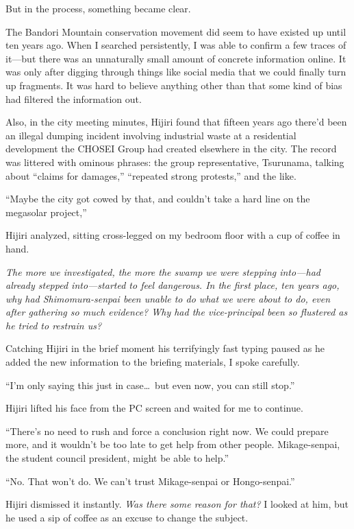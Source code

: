 \documentclass[
    a4paper,
    12pt,
    twoside,
    openany,
    UTF8,
    fontset=windows
]{ctexbook}
\begin{document}
But in the process, something became clear.

The Bandori Mountain conservation movement did seem to have existed up until ten years ago. When I searched persistently, I was able to confirm a few traces of it---but there was an unnaturally small amount of concrete information online. It was only after digging through things like social media that we could finally turn up fragments. It was hard to believe anything other than that some kind of bias had filtered the information out.

Also, in the city meeting minutes, Hijiri found that fifteen years ago there'd been an illegal dumping incident involving industrial waste at a residential development the CHOSEI Group had created elsewhere in the city. The record was littered with ominous phrases: the group representative, Tsurunama, talking about ``claims for damages,'' ``repeated strong protests,'' and the like.

``Maybe the city got cowed by that, and couldn't take a hard line on the megasolar project,''

Hijiri analyzed, sitting cross-legged on my bedroom floor with a cup of coffee in hand.

\textit{The more we investigated, the more the swamp we were stepping into---had already stepped into---started to feel dangerous. In the first place, ten years ago, why had Shimomura-senpai been unable to do what we were about to do, even after gathering so much evidence? Why had the vice-principal been so flustered as he tried to restrain us?}

Catching Hijiri in the brief moment his terrifyingly fast typing paused as he added the new information to the briefing materials, I spoke carefully.

``I'm only saying this just in case\dots\ but even now, you can still stop.''

Hijiri lifted his face from the PC screen and waited for me to continue.

``There's no need to rush and force a conclusion right now. We could prepare more, and it wouldn't be too late to get help from other people. Mikage-senpai, the student council president, might be able to help.''

``No. That won't do. We can't trust Mikage-senpai or Hongo-senpai.''

Hijiri dismissed it instantly. \textit{Was there some reason for that?} I looked at him, but he used a sip of coffee as an excuse to change the subject.
\end{document}
